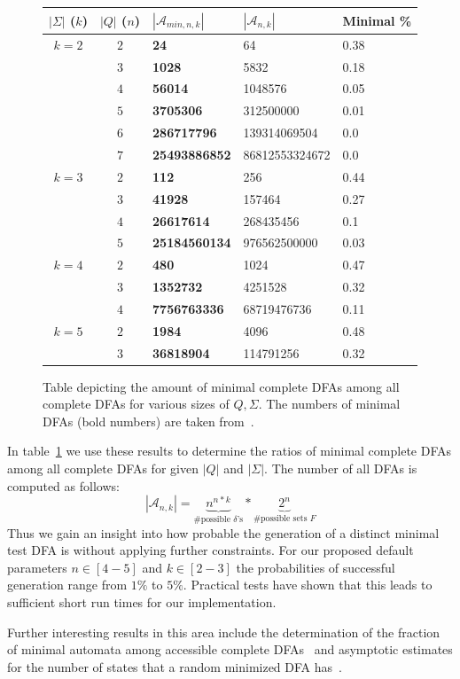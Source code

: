 \begin{figure}[H]
	\centering
	\begin{tabular}{|c|c|l|l|l|}
		\hline
		$|\Sigma|$ ($k$) & $|Q|$ ($n$) & $|\mathcal{A}_{min,n,k}|$ & $|\mathcal{A}_{n,k}|$ & Minimal \% \\\hline
		
		$k = 2$ & $2$ & \textbf{24} & 64 & 0.38 \\
		& $3$ & \textbf{1028} & 5832 & 0.18 \\
		& $4$ & \textbf{56014} & 1048576 & 0.05 \\
		& $5$ & \textbf{3705306} & 312500000 & 0.01 \\
		& $6$ & \textbf{286717796} & 139314069504 & 0.0 \\
		& $7$ & \textbf{25493886852} & 86812553324672 & 0.0 \\\hline
		
		$k = 3$ & $2$ & \textbf{112} & 256 & 0.44 \\
		& $3$ & \textbf{41928} & 157464 & 0.27 \\
		& $4$ & \textbf{26617614} & 268435456 & 0.1 \\
		& $5$ & \textbf{25184560134} & 976562500000 & 0.03 \\\hline
		
		$k = 4$ & $2$ & \textbf{480} & 1024 & 0.47 \\
		& $3$ & \textbf{1352732} & 4251528 & 0.32 \\
		& $4$ & \textbf{7756763336} & 68719476736 & 0.11 \\\hline
		
		$k = 5$ & $2$ & \textbf{1984} & 4096 & 0.48 \\
		& $3$ & \textbf{36818904} & 114791256 & 0.32\\\hline
	\end{tabular}
	\caption{Table depicting the amount of minimal complete DFAs among all complete DFAs for various sizes of $Q, \Sigma$. The numbers of minimal DFAs (bold numbers) are taken from~\cite[p. 8]{AMR09}.}
	\label{fig:dfa_minimal_ratios}
\end{figure}

\noindent In table~\ref{fig:dfa_minimal_ratios} we use these results to determine the ratios of minimal complete DFAs among all complete DFAs for given $|Q|$ and $|\Sigma|$. The number of all DFAs is computed as follows:
\[
|\mathcal{A}_{n,k}| = \underbrace{n^{n*k}}_{\#\text{possible }\delta\text{'s}} * \underbrace{2^n}_{\#\text{possible sets }F}
\]
Thus we gain an insight into how probable the generation of a distinct minimal test DFA is without applying further constraints. For our proposed default parameters $n\in[4-5]$ and $k\in[2-3]$ the probabilities of successful generation range from $1\%$ to $5\%$. Practical tests have shown that this leads to sufficient short run times for our implementation.

Further interesting results in this area include the determination of the fraction of minimal automata among accessible complete DFAs~\cite{BDS11} and asymptotic estimates for the number of states that a random minimized DFA has~\cite{BK13}.
